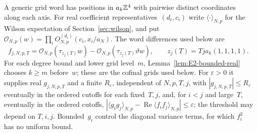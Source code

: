 A generic grid word has positions in $a_k\mathbb{Z}^4$ with pairwise distinct coordinates along each axis. For real coefficient representatives~$(d_i,c_i)$ write $\langle\cdot\rangle_{N,p}$ for the Wilson expectation of Section~\ref{sec:wilson}, and put $\mathcal O_{N,p}(w)=\prod_i O^{(d_i)}_{N,p}(c_i,x_i/a_N)$. The word differences used below are
\begin{equation}\label{eq:H-real-approx}
f_{j,N,p,T}=\mathcal O_{N,p}(\tau_{z_j(T)}w)-\mathcal O_{N,p}(\tau_{z_j(T)}\vartheta w),\qquad z_j(T)=Tja_k(1,1,1,1).
\end{equation}
For each degree bound and lower grid level~$m$, Lemma~\ref{lem:E2-bounded-real} chooses $k\ge m$ before~$w$; these are the cofinal grids used below. For $\varepsilon>0$ it supplies real $g_{j,N,p,T}$ and a finite $R_\varepsilon$, independent of $N,p,T,j$, with $|g_{j,N,p,T}|\le R_\varepsilon$ eventually in the ordered cutoffs for each fixed~$T,j$, and, for $i<j$ and large~$T$, eventually in the ordered cutoffs, $|\langle g_ig_j\rangle_{N,p}-\operatorname{Re}\langle f_if_j\rangle_{N,p}|\le\varepsilon$; the threshold may depend on $T,i,j$. Bounded~$g_i$ control the diagonal variance terms, for which $f_i^2$ has no uniform bound.

